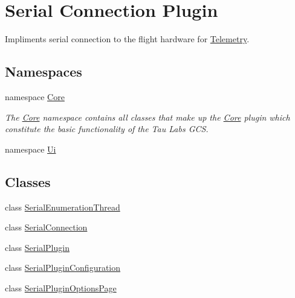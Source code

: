 \hypertarget{group___serial_plugin}{\section{Serial Connection Plugin}
\label{group___serial_plugin}
}


Impliments serial connection to the flight hardware for \hyperlink{class_telemetry}{Telemetry}.  


\subsection*{Namespaces}
\begin{DoxyCompactItemize}
\item 
namespace \hyperlink{namespace_core}{Core}
\begin{DoxyCompactList}\small\item\em The \hyperlink{namespace_core}{Core} namespace contains all classes that make up the \hyperlink{namespace_core}{Core} plugin which constitute the basic functionality of the Tau Labs G\-C\-S. \end{DoxyCompactList}\item 
namespace \hyperlink{namespace_ui}{Ui}
\end{DoxyCompactItemize}
\subsection*{Classes}
\begin{DoxyCompactItemize}
\item 
class \hyperlink{class_serial_enumeration_thread}{Serial\-Enumeration\-Thread}
\item 
class \hyperlink{class_serial_connection}{Serial\-Connection}
\item 
class \hyperlink{class_serial_plugin}{Serial\-Plugin}
\item 
class \hyperlink{class_serial_plugin_configuration}{Serial\-Plugin\-Configuration}
\item 
class \hyperlink{class_serial_plugin_options_page}{Serial\-Plugin\-Options\-Page}
\end{DoxyCompactItemize}
